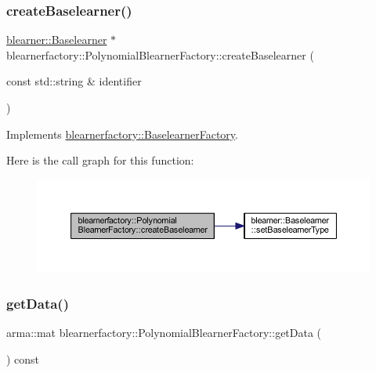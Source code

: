 \subsubsection{\texorpdfstring{create\+Baselearner()}{createBaselearner()}}
{\footnotesize\ttfamily \hyperlink{classblearner_1_1_baselearner}{blearner\+::\+Baselearner} $\ast$ blearnerfactory\+::\+Polynomial\+Blearner\+Factory\+::create\+Baselearner (\begin{DoxyParamCaption}\item[{const std\+::string \&}]{identifier }\end{DoxyParamCaption})\hspace{0.3cm}{\ttfamily [virtual]}}



Implements \hyperlink{classblearnerfactory_1_1_baselearner_factory_ac3584a20a84834099a15908690b837bb}{blearnerfactory\+::\+Baselearner\+Factory}.

Here is the call graph for this function\+:\nopagebreak
\begin{figure}[H]
\begin{center}
\leavevmode
\includegraphics[width=350pt]{classblearnerfactory_1_1_polynomial_blearner_factory_ac0c7f742da0a2de444e91a0cfb0a9384_cgraph}
\end{center}
\end{figure}
\mbox{\label{classblearnerfactory_1_1_polynomial_blearner_factory_addce36fbb590b2cd3d9325b53ae74566}} 
\subsubsection{\texorpdfstring{get\+Data()}{getData()}}
{\footnotesize\ttfamily arma\+::mat blearnerfactory\+::\+Polynomial\+Blearner\+Factory\+::get\+Data (\begin{DoxyParamCaption}{ }\end{DoxyParamCaption}) const\hspace{0.3cm}{\ttfamily [virtual]}}



